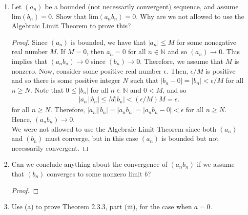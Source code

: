 \documentclass[12pt]{article}
\newcommand{\N}{\mathbb{N}}
\newcommand{\Lim}[1]{\mathrm{lim}\left( #1\right)}
\newenvironment{problem}[2][Problem]{\begin{trivlist} \item[\hskip \labelsep {\bfseries #1}\hskip \labelsep {\bfseries #2.}]}{\end{trivlist}}
\begin{document}
    \begin{problem}{2.3.9}
    \begin{enumerate}
      \item Let $(a_{n})$ be a bounded (not necessarily convergent) sequence, and assume $\Lim{b_{n}} = 0$. Show that $\Lim{a_{n}b_{n}} = 0$. Why are we not allowed to use the Algebraic Limit Theorem to prove this?
    \begin{proof}
      Since $(a_{n})$ is bounded, we have that $|a_{n}|\leq M$ for some nonegative real number $M$. If $M=0$, then $a_{n} = 0$ for all $n\in \N$ and so $(a_{n}) \to 0$. This implies that $(a_{n}b_{n}) \to 0$ since $(b_{n})\to 0$. Therefore, we assume that $M$ is nonzero. Now, consider some positive real number $\epsilon$. Then, $\epsilon/M$ is positive and so there is some positive integer $N$ such that $|b_{n} -0| = |b_{n}| < \epsilon/M$ for all $n\geq N$. Note that $0\leq |b_{n}|$ for all $n\in \N$ and $0<M$, and so
    \begin{align*}
      |a_{n}||b_{n}| \leq M|b_{n}| < (\epsilon/M) M = \epsilon.
    \end{align*}
    for all $n\geq N$. Therefore, $|a_{n}||b_{n}| = |a_{n}b_{n}| = |a_{n}b_{n} - 0| < \epsilon$ for all $n\geq N$. Hence, $(a_{n}b_{n}) \to 0$.\\

  We were not allowed to use the Algebraic Limit Theorem since both $(a_{n})$ and $(b_{n})$ must converge, but in this case $(a_{n})$ is bounded but not necessarily convergent. 
    \end{proof}
      \item Can we conclude anything about the convergence of $(a_{n}b_{n})$ if we assume that $(b_{n})$ converges to some nonzero limit $b$?
    \begin{proof}

    \end{proof}
      \item Use (a) to prove Theorem 2.3.3, part (iii), for the case when $a=0$.
    \end{enumerate}
    \end{problem}
\end{document}
